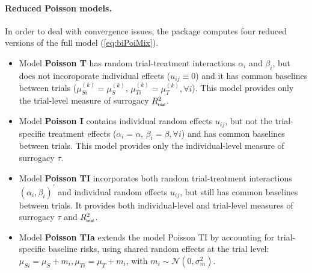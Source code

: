 \documentclass[article,shortnames, nojss]{jss}\usepackage[]{graphicx}\usepackage[]{color}
\begin{document}
\paragraph{Reduced Poisson models.}
In order to deal with convergence issues,
the  package computes four reduced versions 
of the full model (\ref{eq:biPoiMix}).
\begin{itemize}
\item Model \textbf{Poisson T} has
random trial-treatment interactions $\alpha_i$ and $\beta_i$,
but does not incoroporate individual effects ($u_{ij} \equiv 0$)
and it has common baselines between trials
($\mu^{(k)}_{Si} = \mu^{(k)}_{S}$, $\mu^{(k)}_{Ti} = \mu^{(k)}_{T},
\forall i$).
This model provides only the trial-level measure of surrogacy
$R^2_{\textsf{\tiny trial}}$.

\item Model \textbf{Poisson I} contains individual random effects $u_{ij}$,
but not the trial-specific treatment effects 
($\alpha_i = \alpha$, $\beta_i = \beta, \forall i$)
and has common baselines between trials.
This model provides only the individual-level measure of surrogacy
$\tau$.

\item Model \textbf{Poisson TI} incorporates
both random trial-treatment interactions
$(\alpha_i, \beta_i)^\prime$
and individual random effects $u_{ij}$,
but still has common baselines between trials.
It provides both individual-level and trial-level measures of surrogacy
$\tau$ and $R^2_{\textsf{\tiny trial}}$.

\item Model \textbf{Poisson TIa} extends the model Poisson TI
by accounting for trial-specific baseline risks,
using shared random effects at the trial level:
$\mu_{Si} = \mu_S + m_i, \mu_{Ti} = \mu_T + m_i$,
with $m_i\sim\mathcal N(0, \sigma^2_m)$.
\end{itemize}



\end{document}
